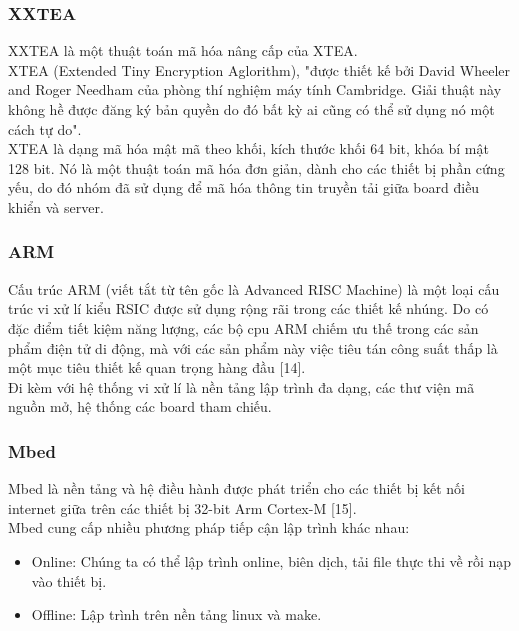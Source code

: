 \documentclass[a4paper,12pt,oneside]{article}
\begin{document}
\subsubsection{XXTEA}
\noindent XXTEA là một thuật toán mã hóa nâng cấp của XTEA.\\
\noindent XTEA (Extended Tiny Encryption Aglorithm), "được thiết kế bởi David Wheeler and Roger Needham của phòng thí nghiệm máy tính Cambridge. Giải thuật này không hề được đăng ký bản quyền do đó bất kỳ ai cũng có thể sử dụng nó một cách tự do"\cite{xxtea}.\\ 
\noindent XTEA là dạng mã hóa mật mã theo khối, kích thước khối 64 bit, khóa bí mật 128 bit. Nó là một thuật toán mã hóa đơn giản, dành cho các thiết bị phần cứng yếu, do đó nhóm đã sử dụng để mã hóa thông tin truyền tải giữa board điều khiển và server.

\subsubsection{ARM}
\noindent Cấu trúc ARM (viết tắt từ tên gốc là Advanced RISC Machine) là một loại cấu trúc vi xử lí kiểu RSIC được sử dụng rộng rãi trong các thiết kế nhúng. Do có đặc điểm tiết kiệm năng lượng, các bộ cpu ARM chiếm ưu thế trong các sản phẩm điện tử di động, mà với các sản phẩm này việc tiêu tán công suất thấp là một mục tiêu thiết kế quan trọng hàng đầu [14].\\
\noindent Đi kèm với hệ thống vi xử lí là nền tảng lập trình đa dạng, các thư viện mã nguồn mở, hệ thống các board tham chiếu.

\subsubsection{Mbed}
\noindent Mbed là nền tảng và hệ điều hành được phát triển cho các thiết bị kết nối internet giữa trên các thiết bị 32-bit Arm Cortex-M [15].\\
\noindent Mbed cung cấp nhiều phương pháp tiếp cận lập trình khác nhau:
\begin{itemize}
	\item Online: Chúng ta có thể lập trình online, biên dịch, tải file thực thi về rồi nạp vào thiết bị.
	\item Offline: Lập trình trên nền tảng linux và make.
\end{itemize}
\end{document}
